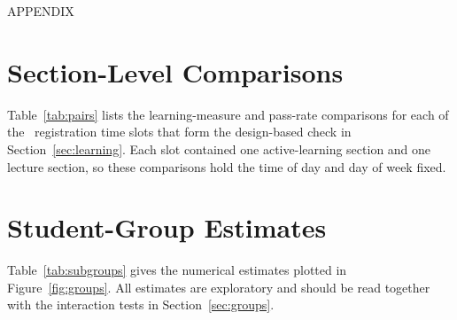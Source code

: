 \documentclass[10pt,twocolumn,letterpaper]{article}
\renewcommand{\thesection}{\arabic{section}}
\begin{document}
\onecolumn
\appendix
\renewcommand{\thesection}{\Alph{section}}
\begin{center}APPENDIX\end{center}
\vspace{6pt}

\section{Section-Level Comparisons}\label{app:pairs}

Table~\ref{tab:pairs} lists the learning-measure and pass-rate comparisons for each of the \PairsN\ registration time slots that form the design-based check in Section~\ref{sec:learning}. Each slot contained one active-learning section and one lecture section, so these comparisons hold the time of day and day of week fixed.



\section{Student-Group Estimates}\label{app:groups}

Table~\ref{tab:subgroups} gives the numerical estimates plotted in Figure~\ref{fig:groups}. All estimates are exploratory and should be read together with the interaction tests in Section~\ref{sec:groups}.


\end{document}
